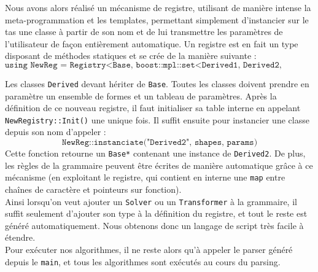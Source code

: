 Nous avons alors réalisé un mécanisme de registre, utilisant de manière intense la meta-programmation et les templates, permettant simplement d'instancier sur le tas une classe à partir de son nom et de lui transmettre les paramètres de l'utilisateur de façon entièrement automatique. Un registre est en fait un type disposant de méthodes statiques et se crée de la manière suivante :
$$\texttt{using NewReg = Registry<Base, boost::mpl::set<Derived1, Derived2, ...>::type>}$$

Les classes \texttt{Derived} devant hériter de \texttt{Base}. Toutes les classes doivent prendre en paramètre un ensemble de formes et un tableau de paramètres. Après la définition de ce nouveau registre, il faut initialiser sa table interne en appelant \texttt{NewRegistry::Init()} une unique fois. Il suffit ensuite pour instancier une classe depuis son nom d'appeler :
$$\texttt{NewReg::instanciate("Derived2", shapes, params)}$$
Cette fonction retourne un \texttt{Base*} contenant une instance de \texttt{Derived2}. De plus, les règles de la grammaire peuvent être écrites de manière automatique grâce à ce mécanisme (en exploitant le registre, qui contient en interne une \texttt{map} entre chaînes de caractère et pointeurs sur fonction).\\

Ainsi lorsqu'on veut ajouter un \texttt{Solver} ou un \texttt{Transformer} à la grammaire, il suffit seulement d'ajouter son type à la définition du registre, et tout le reste est généré automatiquement. Nous obtenons donc un langage de script très facile à étendre.\\

Pour exécuter nos algorithmes, il ne reste alors qu'à appeler le parser généré depuis le \texttt{main}, et tous les algorithmes sont exécutés au cours du parsing.
    
